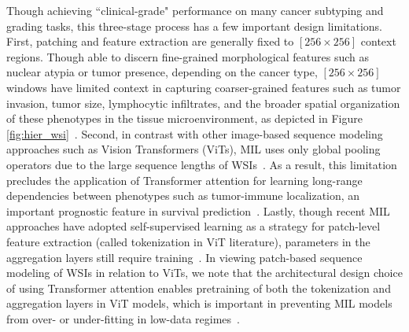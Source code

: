 Though achieving ``clinical-grade" performance on many cancer subtyping and grading tasks, this three-stage process has a few important design limitations. First, patching and feature extraction are generally fixed to $[256 \times 256]$ context regions. Though able to discern fine-grained morphological features such as nuclear atypia or tumor presence, depending on the cancer type, $[256 \times 256]$ windows have limited context in capturing coarser-grained features such as tumor invasion, tumor size, lymphocytic infiltrates, and the broader spatial organization of these phenotypes in the tissue microenvironment, as depicted in Figure \ref{fig:hier_wsi}~\cite{beck2011systematic, Diao2021, chan2019histosegnet}. Second, in contrast with other image-based sequence modeling approaches such as Vision Transformers (ViTs), MIL uses only global pooling operators due to the large sequence lengths of WSIs~\cite{ilse2018attention}. As a result, this limitation precludes the application of Transformer attention for learning long-range dependencies between phenotypes such as tumor-immune localization, an important prognostic feature in survival prediction~\cite{saltz2018spatial, le2020utilizing, abduljabbar2020geospatial}. Lastly, though recent MIL approaches have adopted self-supervised learning as a strategy for patch-level feature extraction (called tokenization in ViT literature), parameters in the aggregation layers still require training~\cite{ciga2021self, saillard2021self, dehaene2020self, koohbanani2021self, boyd2021self, li2021dual, chen2022self}. In viewing patch-based sequence modeling of WSIs in relation to ViTs, we note that the architectural design choice of using Transformer attention enables pretraining of both the tokenization and aggregation layers in ViT models, which is important in preventing MIL models from over- or under-fitting in low-data regimes~\cite{dosovitskiy2021image, li2022efficient, caron2021emerging, bao2022beit, he2021masked}.

